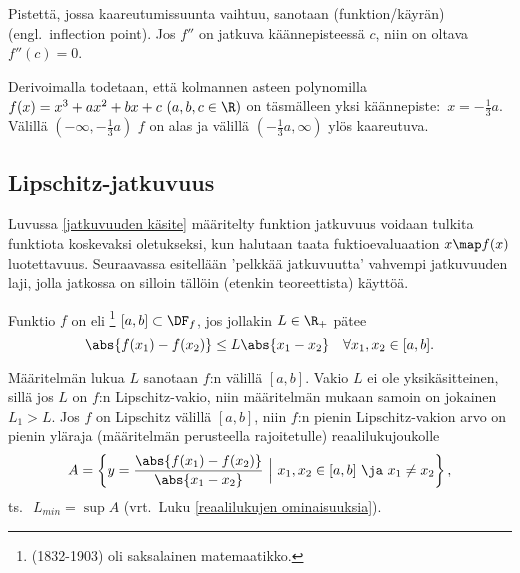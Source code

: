Pistettä, jossa kaareutumissuunta vaihtuu, sanotaan (funktion/käyrän)
 (engl.\ inflection point). Jos $f''$ on jatkuva käännepisteessä $c$, niin
on oltava $f''(c)=0$.
\begin{Exa} Derivoimalla todetaan, että kolmannen asteen polynomilla 
$f(x)=x^3+ax^2+bx+c\ (a,b,c\in\R)$ on täsmälleen yksi käännepiste: $\,x=-\tfrac{1}{3}a$.
Välillä $(-\infty,-\tfrac{1}{3}a)$ $f$ on alas ja välillä $(-\tfrac{1}{3}a,\infty)$ ylös
kaareutuva. \loppu
\end{Exa}

\subsection{Lipschitz-jatkuvuus}

Luvussa \ref{jatkuvuuden käsite} määritelty funktion jatkuvuus voidaan tulkita funktiota
koskevaksi oletukseksi, kun halutaan taata fuktioevaluaation $x \map f(x)$
luotettavuus. Seuraavassa esitellään 'pelkkää jatkuvuutta' vahvempi jatkuvuuden laji, jolla
jatkossa on silloin tällöin (etenkin teoreettista) käyttöä.
\begin{Def} \label{funktion l-jatkuvuus} 
Funktio $f$ on  eli \footnote[2]{
(1832-1903) oli saksalainen matemaatikko.} 
$[a,b]\subset\DF_f$, jos jollakin $L\in\R_+$ pätee
\[
\abs{f(x_1)-f(x_2)}\leq L\abs{x_1-x_2} \quad \forall x_1,x_2\in [a,b].
\]
\end{Def}
Määritelmän lukua $L$ sanotaan $f$:n  välillä $[a,b]$. Vakio $L$ ei
ole yksikäsitteinen, sillä jos $L$ on $f$:n Lipschitz-vakio, niin määritelmän mukaan samoin
on jokainen $L_1 > L$. Jos $f$ on Lipschitz välillä $[a,b]$, niin $f$:n pienin
Lipschitz-vakion arvo on pienin yläraja (määritelmän perusteella rajoitetulle)
reaalilukujoukolle
\[
A = \left\{ y = \frac{\abs{f(x_1)-f(x_2)}}{\abs{x_1-x_2}}\ 
                              \Big\vert\ x_1,x_2 \in [a,b]\ \ja\ x_1 \neq x_2\right\},
\]
ts.\ $\ L_{min} = \sup A$ (vrt.\ Luku \ref{reaalilukujen ominaisuuksia}).

